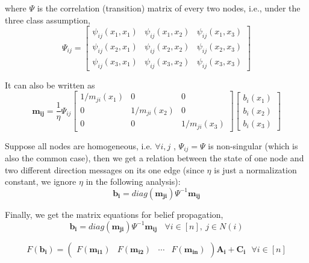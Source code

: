 where $\Psi$ is the correlation (transition) matrix of every two nodes, i.e., under the three class assumption,
\begin{equation}
\Psi_{ij} = \left[ \begin{array}{ccc}
\psi_{ij}(x_1,x_1)&\psi_{ij}(x_1,x_2)&\psi_{ij}(x_1,x_3) \\
\psi_{ij}(x_2,x_1)&\psi_{ij}(x_2,x_2)&\psi_{ij}(x_2,x_3) \\
\psi_{ij}(x_3,x_1)&\psi_{ij}(x_3,x_2)&\psi_{ij}(x_3,x_3) \end{array} \right]
\end{equation}

It can also be written as
\begin{equation}
\mathbf{m_{ij}} = \frac{1}{\eta} \Psi_{ij} \left[ \begin{array}{ccc}
1/m_{ji}(x_1)&0&0 \\
0 &1/m_{ji}(x_2)&0 \\
0& 0 &1/m_{ji}(x_3) \end{array} \right] \left[ \begin{array}{c}
b_i(x_1)\\
b_i(x_2)\\
b_i(x_3)\end{array} \right]
\end{equation}

Suppose all nodes are homogeneous, i.e. $\forall i,j$ , $\Psi_{ij} = \Psi$ is non-singular (which is also the common case), then we get a relation between the state of one node and two different direction messages on its one edge (since $\eta$ is just a normalization constant, we ignore $\eta$ in the following analysis):
\begin{equation}
\mathbf{b_i} = diag(\mathbf{m_{ji}})\Psi^{-1}\mathbf{m_{ij}}
\end{equation}

Finally, we get the matrix equations for belief propagation,
\begin{equation}
\label{equ:bfnewrule_b}
\mathbf{b_i} = diag(\mathbf{m_{ji}})\Psi^{-1}\mathbf{m_{ij}}~~~~\forall i\in [n],~j\in N(i)
\end{equation}

\begin{equation}
\label{equ:bfnewrule_m}
F(\mathbf{b_i})=
\left( \begin{array}{cccc}
F(\mathbf{m_{i1}})&F(\mathbf{m_{i2}})&\cdots& F(\mathbf{m_{in}})\end{array} \right)\mathbf{A_i}+\mathbf{C_i}~~~\forall i\in [n]
\end{equation}

